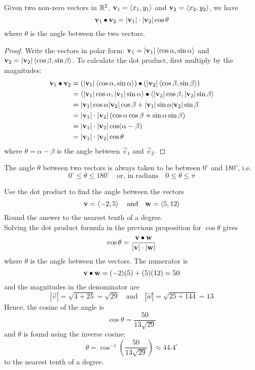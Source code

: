 \documentclass[handout]{ximera}
\begin{document}
\begin{proposition}
Given two non-zero vectors in $\mathbb R^2$, $\mathbf{v}_1 = \left\langle x_1, y_1\right\rangle$ and $\mathbf{v}_2 = \left\langle x_2, y_2\right\rangle$, we have
\[
\mathbf{v}_1 \bullet \mathbf{v}_2 = |\mathbf{v}_1| \cdot |\mathbf{v}_2| \cos \theta
\]
where $\theta$ is the angle between the two vectors.

\begin{proof}
Write the vectors in polar form: $\mathbf{v}_1 = |\mathbf{v}_1| \left\langle \cos \alpha, \sin \alpha\right\rangle$ and 
$\mathbf{v}_2 = |\mathbf{v}_2| \left\langle \cos \beta, \sin \beta\right\rangle$. To calculate the dot product, first multiply by the magnitudes:
\begin{align*}
\mathbf{v}_1 \bullet \mathbf{v}_2 & = \left(|\mathbf{v}_1| \left\langle \cos \alpha, \sin \alpha\right\rangle\right) \bullet \left( |\mathbf{v}_2| \left\langle \cos \beta, \sin \beta\right\rangle \right)\\
                            &= \left\langle |\mathbf{v}_1|\cos \alpha, |\mathbf{v}_1|\sin \alpha\right\rangle \bullet   \left\langle |\mathbf{v}_2|\cos \beta, |\mathbf{v}_2|\sin \beta\right\rangle \\
                            &= |\mathbf{v}_1| \cos \alpha |\mathbf{v}_2|\cos \beta + |\mathbf{v}_1|\sin \alpha |\mathbf{v}_2|\sin \beta\\
                            &= |\mathbf{v}_1|\cdot |\mathbf{v}_2| \left(\cos \alpha \cos \beta + \sin \alpha \sin \beta\right)\\
                            &= |\mathbf{v}_1| \cdot|\mathbf{v}_2| \cos(\alpha - \beta)\\
                            &= |\mathbf{v}_1| \cdot |\mathbf{v}_2| \cos \theta
\end{align*}
where $\theta = \alpha - \beta$ is the angle between $\vec{v}_1$ and $\vec{v}_2$.
\end{proof}

\end{proposition}

\begin{remark} The angle $\theta$ between two vectors is always taken to be between $0^\circ$ and $180^\circ$, i.e.
\[
0^\circ \leq \theta \leq 180^\circ \quad \text{or, in radians} \quad 0 \leq \theta \leq \pi
\]
\end{remark}


\begin{example}[Example 2] Use the dot product to find the angle between the vectors 
\[
\mathbf v = \left\langle -2,5\right\rangle \quad \text{and} \quad \mathbf w = \left\langle 5,12\right\rangle
\]
Round the answer to the nearest tenth of a degree.\\
Solving the dot product formula in the previous proposition for $\cos \theta$ gives
\[
\cos \theta = \frac{\mathbf v \bullet \mathbf w}{|\mathbf v| \cdot |\mathbf w|}
\]
where $\theta$ is the angle between the vectors. The numerator is
\[
\mathbf v \bullet \mathbf w = (-2)(5) + (5)(12) = 50
\]
and the magnitudes in the denominator are 
\[
|\vec v| = \sqrt{ 4 + 25} = \sqrt{29} \quad \text{and} \quad |\vec w| = \sqrt{25 +144 } = 13
\]
Hence, the cosine of the angle is
\[
\cos \theta = \frac{50}{13\sqrt{29}}
\]
and $\theta$ is found using the inverse cosine:
\[
\theta = \cos^{-1}\left(\frac{50}{13\sqrt{29}} \right) \approx 44.4^\circ
\]
to the nearest tenth of a degree.
\end{example}
\end{document}

